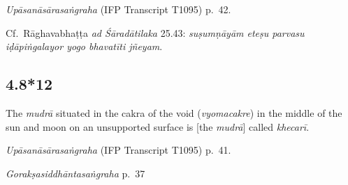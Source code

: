 \begin{ekdosis}

\begin{testimonia}[hp04_008_11]
\emph{Upāsanāsārasaṅgraha} (IFP Transcript T1095) p.~42.
\begin{versinnote}
\end{versinnote}
\end{testimonia}

\begin{philcomm}[hp04_008_11]
Cf.~Rāghavabhaṭṭa \emph{ad Śāradātilaka} 25.43: \emph{suṣumṇāyām eteṣu parvasu iḍāpiṅgalayor yogo bhavatīti jñeyam}.
\end{philcomm}

\subsection*{4.8*12}
\begin{translation}[hp04_008_12]
The \emph{mudrā} situated in the cakra of the void (\emph{vyomacakre}) in the middle of the sun and moon on an unsupported surface is [the \emph{mudrā}] called \emph{khecarī}.
\end{translation}


\begin{testimonia}[hp04_008_12]
\emph{Upāsanāsārasaṅgraha} (IFP Transcript T1095) p.~41.
\begin{versinnote}
\end{versinnote}

\emph{Gorakṣasiddhāntasaṅgraha} p.~37
\begin{versinnote}
\end{versinnote}
\end{testimonia}


\end{ekdosis}
